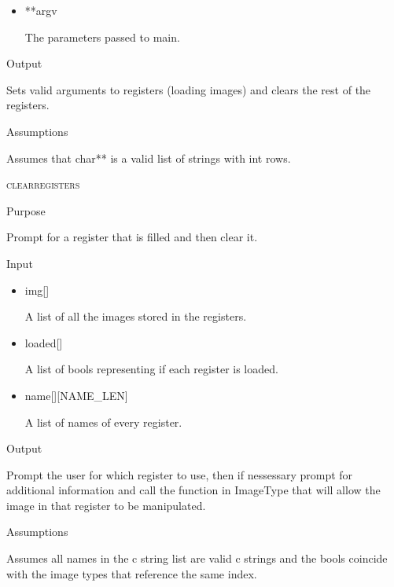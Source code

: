\documentclass[pdftex, 11pt]{article}
\begin{document}
\begin{description}
\begin{description}
\begin{itemize}
					\item{**argv}

						The parameters passed to main.

				\end{itemize}

			\item{Output}

				Sets valid arguments to registers (loading images) and
				clears the rest of the registers.

			\item{Assumptions}

				Assumes that char** is a valid list of strings with int
				rows.

		\end{description}



	\item{\textsc{clearregisters}}
		\begin{description}
			\item{Purpose}

				Prompt for a register that is filled and then clear it.
				
			\item{Input}

				\begin{itemize}

					\item{img[]}

						A list of all the images stored in the registers.

					\item{loaded[]}

						A list of bools representing if each register is loaded.

					\item{name[][NAME\_LEN]}

						A list of names of every register.

				\end{itemize}

			\item{Output}

				Prompt the user for which register to use, then if nessessary
				prompt for additional information and call the function
				in ImageType that will allow the image in that register to
				be manipulated.

			\item{Assumptions}

				Assumes all names in the c string list are valid c
				strings and the bools coincide with the image types that
				reference the same index.


\end{description}
\end{description}
\end{document}
